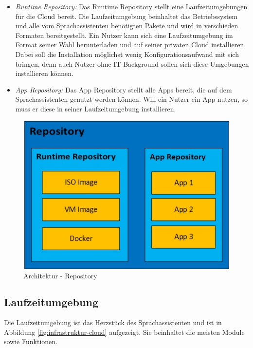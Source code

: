 \begin{itemize}
	\item \textsl{Runtime Repository:} Das Runtime Repository stellt eine Laufzeitumgebungen für die Cloud bereit. Die Laufzeitumgebung beinhaltet das Betriebssystem und alle vom Sprachassistenten benötigten Pakete und wird in verschieden Formaten bereitgestellt. Ein Nutzer kann sich eine Laufzeitumgebung im Format seiner Wahl herunterladen und auf seiner privaten Cloud installieren. Dabei soll die Installation möglichst wenig Konfigurationsaufwand mit sich bringen, denn auch Nutzer ohne IT-Background sollen sich diese Umgebungen installieren können. 
	\item \textsl{App Repository:} Das App Repository stellt alle Apps bereit, die auf dem Sprachassistenten genutzt werden können. Will ein Nutzer ein App nutzen, so muss er diese in seiner Laufzeitumgebung installieren.
\end{itemize}


\begin{figure}[h!]
	\centering
	\includegraphics[width=0.6\linewidth]{Picture/Infrastruktur-Repository.jpg}
	\caption[Architektur - mobile App]{Architektur - Repository}
	\label{fig:infrastruktur-repository}
\end{figure}

\subsection{Laufzeitumgebung}
Die Laufzeitumgebung ist das Herzstück des Sprachassistenten und ist in Abbildung \ref{fig:infrastruktur-cloud} aufgezeigt. Sie beinhaltet die meisten Module sowie Funktionen.

